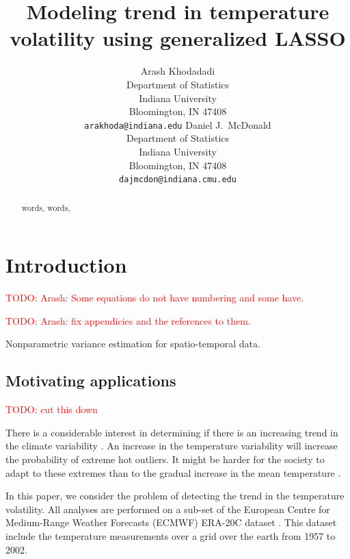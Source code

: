 \documentclass{article}
\title{Modeling trend in temperature volatility using generalized LASSO}
\author{Arash Khodadadi\\
 Department of Statistics\\
 Indiana University\\
 Bloomington, IN 47408 \\
 \texttt{arakhoda@indiana.edu}
\And
  Daniel J.\ McDonald \\
 Department of Statistics\\
 Indiana University\\
 Bloomington, IN 47408 \\
 \texttt{dajmcdon@indiana.cmu.edu}}
\newcommand{\attn}[1]{\textcolor{red}{TODO: #1}}
\begin{document}
 


\maketitle


\begin{abstract}
words, words,

\end{abstract}



\section{Introduction}

\attn{Arash: Some equations do not have numbering and some have.}

\attn{Arash: fix appendicies and the references to them.}

Nonparametric variance estimation for spatio-temporal data.

\subsection{Motivating applications}

\attn{cut this down}

There is a considerable interest in determining if there is an
increasing trend in the climate variability
\citep{hansen_perception_2012,huntingford_no_2013}. An increase in the
temperature variability will increase the probability of extreme hot
outliers. It might be harder for the society to adapt to these
extremes than to the gradual increase in the mean temperature
\citep{huntingford_no_2013}. 

In this paper, we consider the problem of detecting the trend in the
temperature volatility. All analyses are performed on a sub-set of the
European Centre for Medium-Range Weather Forecasts (ECMWF) ERA-20C
dataset \citep{uppala_era-40_2005}. This dataset include the
temperature measurements over a grid over the earth from 1957 to
2002.~\citep{VasseurDeLong2014,TrenberthZhang2014,StatenKahn2016,Screen2014,FischerBeyerle2013} 
\end{document}
